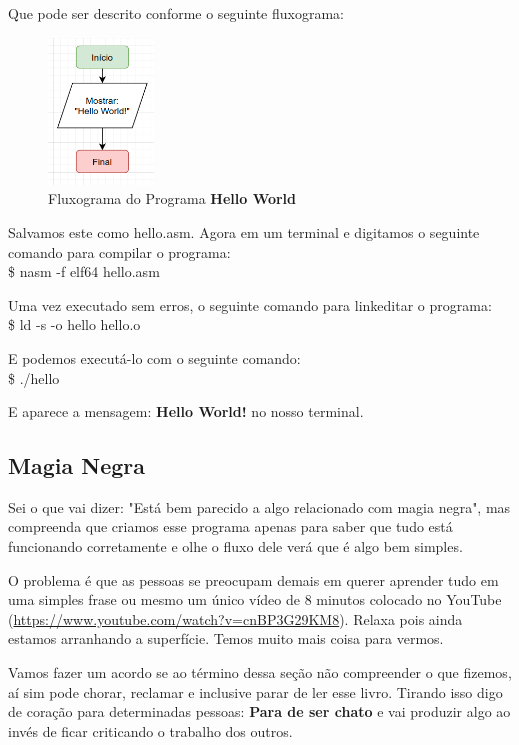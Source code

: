 Que pode ser descrito conforme o seguinte fluxograma:
\begin{figure}[H]
	\centering
	\includegraphics[width=0.25\textwidth]{Pictures/cap01/programa1}
	\caption{Fluxograma do Programa \textbf{Hello World}}
\end{figure}

Salvamos este como hello.asm. Agora em um terminal e digitamos o seguinte comando para compilar o programa: \\
{\ttfamily\$ nasm -f elf64 hello.asm}

Uma vez executado sem erros, o seguinte comando para linkeditar o programa: \\
{\ttfamily\$ ld -s -o hello hello.o}

E podemos executá-lo com o seguinte comando: \\
{\ttfamily\$ ./hello}

E aparece a mensagem: \textbf{Hello World!} no nosso terminal.

\subsection{Magia Negra}

Sei o que vai dizer: "Está bem parecido a algo relacionado com magia negra", mas compreenda que criamos esse programa apenas para saber que tudo está funcionando corretamente e olhe o fluxo dele verá que é algo bem simples. 

O problema é que as pessoas se preocupam demais em querer aprender tudo em uma simples frase ou mesmo um único vídeo de 8 minutos colocado no YouTube (\url{https://www.youtube.com/watch?v=cnBP3G29KM8}). Relaxa pois ainda estamos arranhando a superfície. Temos muito mais coisa para vermos.

Vamos fazer um acordo se ao término dessa seção não compreender o que fizemos, aí sim pode chorar, reclamar e inclusive parar de ler esse livro. Tirando isso digo de coração para determinadas pessoas: \textbf{Para de ser chato} e vai produzir algo ao invés de ficar criticando o trabalho dos outros.

